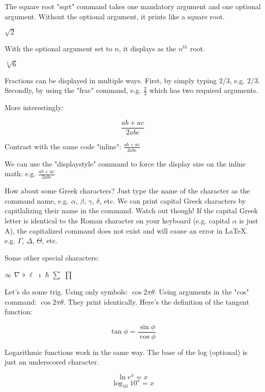 \documentclass{article}
\begin{document}
The square root "sqrt" command takes one mandatory argument and one optional argument.  Without the optional argument, it prints like a square root. 

$\sqrt{2}$

With the optional argument set to $n$, it displays as the $n^{th}$ root.

$\sqrt[3]{6}$

Fractions can be displayed in multiple ways.  First, by simply typing 2/3, e.g. $2/3$.  Secondly, by using the "frac" command, e.g. $\frac{2}{3}$ which has two required arguments.

More interestingly:

$$\frac{ab + ac}{2abc}$$

Contrast with the same code "inline": $\frac{ab + ac}{2abc}$

We can use the "displaystyle" command to force the display size on the inline math: e.g. $\displaystyle{\frac{ab + ac}{2abc}}$


How about some Greek characters?  Just type the name of the character as the command name, e.g. $\alpha$, $\beta$, $\gamma$, $\delta$, etc.  We can print capital Greek characters by capitlalizing their name in the command.  Watch out though!  If the capital Greek letter is identical to the Roman character on your keyboard (e.g. capital $\alpha$ is just A), the capitalized command does not exist and will cause an error in LaTeX.  e.g. $\Gamma$, $\Delta$, $\Theta$, etc.


Some other special characters:

$\infty$
$\nabla$
$\flat$
$\ell$
$\imath$
$\hbar$
$\sum$
$\prod$
 

Let's do some trig.  Using only symbols: $\cos 2\pi \theta$.  Using arguments in the "cos" command: $\cos{2\pi\theta}$.  They print identically.  Here's the definition of the tangent function:

$$\tan \phi = \frac{\sin \phi}{\cos \phi}$$

Logarithmic functions work in the same way.  The base of the log (optional) is just an underscored character.

$$\ln e^x = x$$
$$\log_{10} 10^x = x$$
\end{document}
